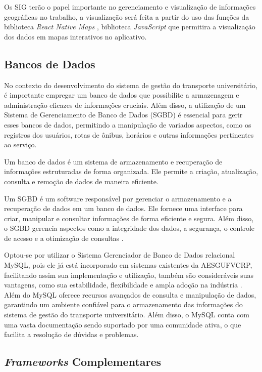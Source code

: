 \documentclass[
    12pt,                   %
    openright,              %
    oneside,                %
    a4paper,                %
    sumario=tradicional,    %
    english,                %
    brazil,                 %
    ]{abntex2}
\begin{document}
Os SIG terão o papel importante no gerenciamento e visualização de informações geográficas no  trabalho, a visualização será feita a partir do uso das funções da biblioteca \textit{React Native Maps} \cite{logrocket-react-native-maps}, biblioteca \textit{JavaScript} que permitira a visualização dos dados em mapas interativos no aplicativo.

\subsection{Bancos de Dados}
\label{subsec:bancos-dados}

No contexto do desenvolvimento do sistema de gestão do transporte universitário, é importante empregar um banco de dados que possibilite a armazenagem e administração eficazes de informações cruciais. Além disso, a utilização de um Sistema de Gerenciamento de Banco de Dados (SGBD) é essencial para gerir esses bancos de dados, permitindo a manipulação de variados aspectos, como os registros dos usuários, rotas de ônibus, horários e outras informações pertinentes ao serviço.

Um banco de dados é um sistema de armazenamento e recuperação de informações estruturadas de forma organizada. Ele permite a criação, atualização, consulta e remoção de dados de maneira eficiente.

Um SGBD é um software responsável por gerenciar o armazenamento e a recuperação de dados em um banco de dados. Ele fornece uma interface para criar, manipular e consultar informações de forma eficiente e segura. Além disso, o SGBD gerencia aspectos como a integridade dos dados, a segurança, o controle de acesso e a otimização de consultas \cite{elmasri2000sistemas}.

Optou-se por utilizar o Sistema Gerenciador de Banco de Dados relacional MySQL, pois ele já está incorporado em sistemas existentes da AESGUFVCRP, facilitando assim sua implementação e utilização, também são consideráveis suas vantagens, como sua estabilidade, flexibilidade e ampla adoção na indústria \cite{mysql}. Além do MySQL oferece recursos avançados de consulta e manipulação de dados, garantindo um ambiente confiável para o armazenamento das informações do sistema de gestão do transporte universitário. Além disso, o MySQL conta com uma vasta documentação sendo suportado por uma comunidade ativa, o que facilita a resolução de dúvidas e problemas.

\subsection{\textit{Frameworks} Complementares}
\label{subsec:frameworks-complementares}
\end{document}
